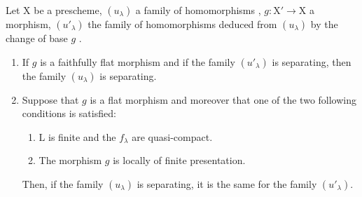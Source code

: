 \begin{theorem}[11.9.10]
\label{IV.11.9.10}
Let $\mathrm{X}$ be a prescheme, $(u_\lambda)$ a family of homomorphisms , $g:\mathrm{X}'\to\mathrm{X}$ a morphism, $(u'_\lambda)$ the family of homomorphisms deduced from $(u_\lambda)$ by the change of base $g$ .
\begin{enumerate}[label=\textup{(\roman*)}]
  \item If $g$ is a faithfully flat morphism and if the family $(u'_\lambda)$ is separating, then the family $(u_\lambda)$ is separating.
  \item Suppose that $g$ is a flat morphism and moreover that \textup{one} of the two following conditions is satisfied:
  \begin{enumerate}[label=\emph{\alph*)}]
    \item $\mathrm{L}$ is finite and the $f_\lambda$ are quasi-compact.
    \item The morphism $g$ is locally of finite presentation.
  \end{enumerate}
  Then, if the family $(u_\lambda)$ is separating, it is the same for the family $(u'_\lambda)$.
\end{enumerate}
\end{theorem}


